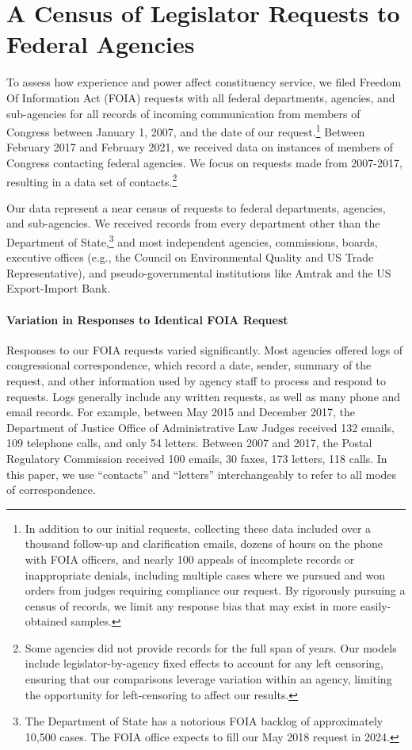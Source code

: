 \documentclass[12pt]{article}
\begin{document}
\section{A Census of Legislator Requests to Federal Agencies} \label{s:data}
To assess how experience and power affect constituency service, we filed  Freedom Of Information Act (FOIA) requests with all federal departments, agencies, and sub-agencies for all records of incoming communication from members of Congress between January 1, 2007, and the date of our request.\footnote{In addition to our initial requests, collecting these data included over a thousand follow-up and clarification emails, dozens of hours on the phone with FOIA officers, and nearly 100 appeals of incomplete records or inappropriate denials, including multiple cases where we pursued and won orders from judges requiring compliance our request. By rigorously pursuing a census of records, we limit any response bias that may exist in more easily-obtained samples.} Between February 2017 and February 2021, we received data on instances of members of Congress contacting federal agencies. We focus on requests made from 2007-2017, resulting in a data set of  contacts.\footnote{Some agencies did not provide records for the full span of years. Our models include legislator-by-agency fixed effects to account for any left censoring, ensuring that our comparisons leverage variation within an agency, limiting the opportunity for left-censoring to affect our results.}  %

Our data represent a near census of requests to federal departments, agencies, and sub-agencies. We received records from every department other than the Department of State,\footnote{The Department of State has a notorious FOIA backlog of approximately 10,500 cases. The FOIA office expects to fill our May 2018 request in 2024.} and most independent agencies, commissions, boards, executive offices (e.g., the Council on Environmental Quality and US Trade Representative), and pseudo-governmental institutions like Amtrak and the US Export-Import Bank. 

\paragraph{Variation in Responses to Identical FOIA Request} Responses to our FOIA requests varied significantly. Most agencies offered logs of congressional correspondence, which record a date, sender, summary of the request, and other information used by agency staff to process and respond to requests. Logs generally include any written requests, as well as many phone and email records. For example, between May 2015 and December 2017, the Department of Justice Office of Administrative Law Judges received 132 emails, 109 telephone calls, and only 54 letters. Between 2007 and 2017, the Postal Regulatory Commission received 100 emails, 30 faxes, 173 letters, 118 calls. In this paper, we use ``contacts'' and ``letters'' interchangeably to refer to all modes of correspondence. 
\end{document}
